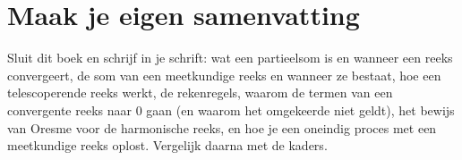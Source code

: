 \begin{oefeningen}



\end{oefeningen}


\begin{oefeningen}






\end{oefeningen}


\ifzelfstudie
\section*{Maak je eigen samenvatting}
Sluit dit boek en schrijf in je schrift: wat een partieelsom is en wanneer een reeks convergeert, de som van een meetkundige reeks en wanneer ze bestaat, hoe een telescoperende reeks werkt, de rekenregels, waarom de termen van een convergente reeks naar 0 gaan (en waarom het omgekeerde niet geldt), het bewijs van Oresme voor de harmonische reeks, en hoe je een oneindig proces met een meetkundige reeks oplost. Vergelijk daarna met de kaders.
\fi
